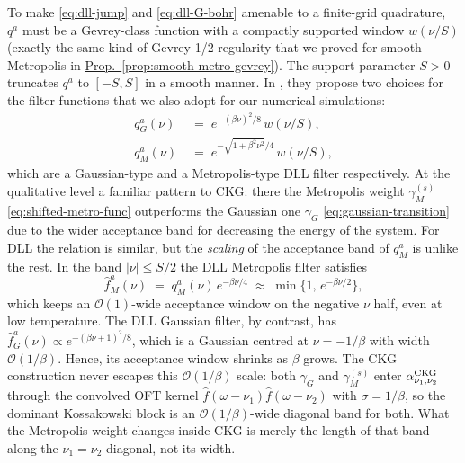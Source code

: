 To make \eqref{eq:dll-jump} and \eqref{eq:dll-G-bohr} amenable to a finite-grid quadrature, $q^a$ must be a Gevrey-class function with a compactly supported window $w(\nu/S)$ (exactly the same kind of Gevrey-1/2 regularity that we proved for smooth Metropolis in \hyperref[prop:smooth-metro-gevrey]{Prop.~\ref*{prop:smooth-metro-gevrey}}). The support parameter $S>0$ truncates $q^a$ to $[-S, S]$  in a smooth manner. In \cite{ding2025efficient}, they propose two choices for the filter functions that we also adopt for our numerical simulations:
\begin{equation} \label{eq:dll-filters}
    \begin{split}
        q^a_G(\nu) &\;=\; e^{-(\beta\nu)^2/8}\,w(\nu/S), \\
        q^a_M(\nu) &\;=\; e^{-\sqrt{1+\beta^2\nu^2}/4}\,w(\nu/S),
    \end{split}
\end{equation}
which are a Gaussian-type and a Metropolis-type DLL filter respectively. At the qualitative level a familiar pattern to CKG: there the Metropolis weight 
$\gamma_M^{(s)}$ \eqref{eq:shifted-metro-func} outperforms the Gaussian one $\gamma_G$ \eqref{eq:gaussian-transition} due to the wider acceptance band for decreasing the energy of the system. For DLL the relation is similar, but the \emph{scaling} of the acceptance band of $q^a_M$ is unlike the rest. In the band $|\nu|\leq S/2$ the DLL Metropolis filter satisfies
$$
\widehat{f}^a_M(\nu) \;=\; q^a_M(\nu)\,e^{-\beta\nu/4} \;\approx\; \min\!\bigl\{1,\, e^{-\beta\nu/2}\bigr\},
$$
which keeps an $\mathcal{O}(1)$-wide acceptance window on the negative $\nu$ half, even at low temperature. The DLL Gaussian filter, by contrast, has $\widehat{f}^a_G(\nu) \propto e^{-(\beta\nu+1)^2/8}$, which is a Gaussian centred at $\nu=-1/\beta$ with width $\mathcal{O}(1/\beta)$. Hence, its acceptance window shrinks as $\beta$ grows. The CKG construction never escapes this $\mathcal{O}(1/\beta)$ scale: both $\gamma_G$ and $\gamma_M^{(s)}$ enter $\alpha^{\textup{CKG}}_{\nu_1,\nu_2}$ through the convolved OFT kernel $\hat{f}(\omega-\nu_1)\hat{f}(\omega-\nu_2)$ with $\sigma = 1 / \beta$, so the dominant Kossakowski block is an $\mathcal{O}(1/\beta)$-wide diagonal band for both. What the Metropolis weight changes inside CKG is merely the length of that band along the $\nu_1 = \nu_2$ diagonal, not its width. 

\smallskip
\label{sec:dll-kossakowski}
